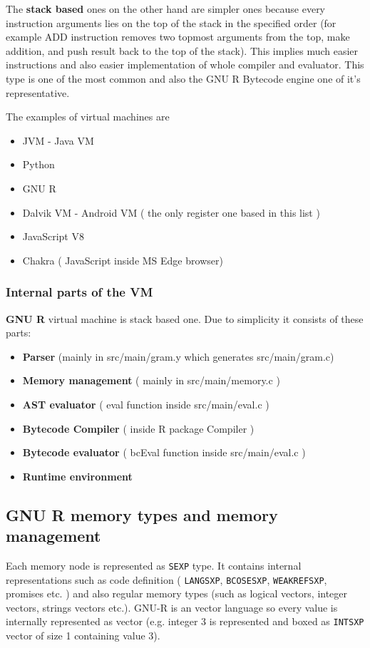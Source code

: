 \documentclass[thesis=M,english]{FITthesis}[2018/10/20]
\newcommand{\code}[1]{\texttt{#1}}
\begin{document}
The \textbf{stack based} ones on the other hand are simpler ones because every instruction arguments lies on the top of the stack in the specified order (for example ADD instruction removes two topmost arguments from the top, make addition, and push result back to the top of the stack). This implies much easier instructions and also easier implementation of whole compiler and evaluator. This type is one of the most common and also the GNU R Bytecode engine one of it's representative.

The examples of virtual machines are
\begin{itemize}
	\item JVM - Java VM
	\item Python
	\item GNU R
	\item Dalvik VM - Android VM ( the only register one based in this list )
	\item JavaScript V8
	\item Chakra ( JavaScript inside MS Edge browser)
\end{itemize}

\subsubsection{Internal parts of the VM}\label{internal-parts-of-vm}

\textbf{GNU R} virtual machine is stack based one. Due to simplicity it consists of these parts:
\begin{itemize}
	\item \textbf{Parser} (mainly in src/main/gram.y which generates src/main/gram.c)
	\item \textbf{Memory management} ( mainly in src/main/memory.c )
	\item \textbf{AST evaluator} ( eval function inside src/main/eval.c )
	\item \textbf{Bytecode Compiler} ( inside R package Compiler )
	\item \textbf{Bytecode evaluator} ( bcEval function inside src/main/eval.c )
	\item \textbf{Runtime environment}
\end{itemize}

\subsection{GNU R memory types and memory management}\label{memory-management}

Each memory node is represented as \code{SEXP} type. It contains internal representations such as code definition ( \code{LANGSXP}, \code{BCOSESXP}, \code{WEAKREFSXP}, promises etc. ) and also regular memory types (such as logical vectors, integer vectors, strings vectors etc.). GNU-R is an vector language so every value is internally represented as vector (e.g. integer 3 is represented and boxed as \code{INTSXP} vector of size 1 containing value 3).
\end{document}
